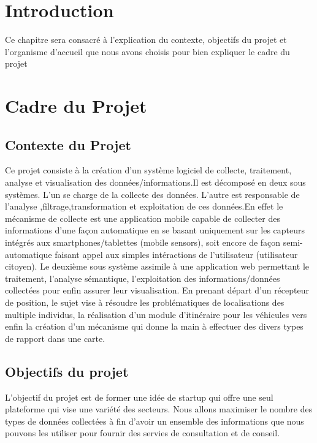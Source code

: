 \section*{Introduction}

Ce chapitre sera consacré à l'explication du contexte, objectifs du projet et
l'organisme d'accueil que nous avons choisis pour bien expliquer
le cadre du projet
\section{ Cadre du Projet}

\subsection{Contexte du Projet}
Ce projet consiste à la création d’un système logiciel de collecte, traitement,
analyse et visualisation des données/informations.Il est décomposé en deux sous systèmes.
L’un se charge de la collecte des données. L’autre est responsable de l'analyse ,filtrage,transformation
et exploitation de ces données.En effet le mécanisme de collecte est une application mobile capable 
de collecter des
informations d’une façon automatique en se basant uniquement sur les capteurs intégrés
aux smartphones/tablettes (mobile sensors), soit encore de
façon semi-automatique faisant appel aux simples intéractions de l’utilisateur
(utilisateur citoyen). Le deuxième sous système assimile à une application
web permettant le traitement, l’analyse sémantique, l'exploitation
des informations/données collectées pour enfin assurer leur visualisation.
En prenant départ d’un récepteur de position, le sujet vise à résoudre les
problématiques de localisations des multiple individus, la réalisation d’un
module d’itinéraire pour les véhicules vers enfin la création d’un mécanisme
qui donne la main à effectuer des divers types de rapport dans une carte.

\subsection{Objectifs du projet}

L'objectif du projet est de former une idée de startup qui offre une seul plateforme qui vise
une variété
des secteurs. Nous allons maximiser le nombre des types de données collectées à
fin d'avoir un ensemble des informations que nous pouvons les utiliser pour
fournir des servies de consultation et de conseil.

